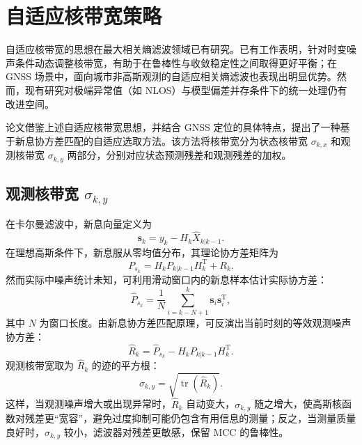 \section{自适应核带宽策略}


自适应核带宽的思想在最大相关熵滤波领域已有研究。已有工作表明，针对时变噪声条件动态调整核带宽，有助于在鲁棒性与收敛稳定性之间取得更好平衡；在 GNSS 场景中，面向城市非高斯观测的自适应相关熵滤波也表现出明显优势\cite{xie2025adaptive}。然而，现有研究对极端异常值（如 NLOS）与模型偏差并存条件下的统一处理仍有改进空间。

论文借鉴上述自适应核带宽思想，并结合 GNSS 定位的具体特点，提出了一种基于新息协方差匹配的自适应选取方法。该方法将核带宽分为状态核带宽 \(\sigma_{k,x}\) 和观测核带宽 \(\sigma_{k,y}\) 两部分，分别对应状态预测残差和观测残差的加权。

\subsection{观测核带宽 $\sigma_{k,y}$}

在卡尔曼滤波中，新息向量定义为
\begin{equation}
    \bm{s}_k = y_k - H_k \hat{X}_{k|k-1}.
    \label{eq:adaptive_innovation}
\end{equation}
在理想高斯条件下，新息服从零均值分布，其理论协方差矩阵为
\begin{equation}
    P_{s_k} = H_k P_{k|k-1} H_k^{\mathrm{T}} + R_k.
    \label{eq:adaptive_innovation_cov_theory}
\end{equation}
然而实际中噪声统计未知，可利用滑动窗口内的新息样本估计实际协方差：
\begin{equation}
    \hat{P}_{s_k} = \frac{1}{N} \sum_{i=k-N+1}^{k} \bm{s}_i \bm{s}_i^{\mathrm{T}},
    \label{eq:adaptive_innovation_cov_sample}
\end{equation}
其中 \(N\) 为窗口长度。由新息协方差匹配原理，可反演出当前时刻的等效观测噪声协方差：
\begin{equation}
    \hat{R}_k = \hat{P}_{s_k} - H_k P_{k|k-1} H_k^{\mathrm{T}}.
    \label{eq:adaptive_r_hat}
\end{equation}
观测核带宽取为 \(\hat{R}_k\) 的迹的平方根：
\begin{equation}
    \sigma_{k,y} = \sqrt{\operatorname{tr}(\hat{R}_k)}.
    \label{eq:adaptive_sigma_y}
\end{equation}
这样，当观测噪声增大或出现异常时，\(\hat{R}_k\) 自动变大，\(\sigma_{k,y}\) 随之增大，使高斯核函数对残差更“宽容”，避免过度抑制可能仍包含有用信息的测量；反之，当测量质量良好时，\(\sigma_{k,y}\) 较小，滤波器对残差更敏感，保留 MCC 的鲁棒性。

